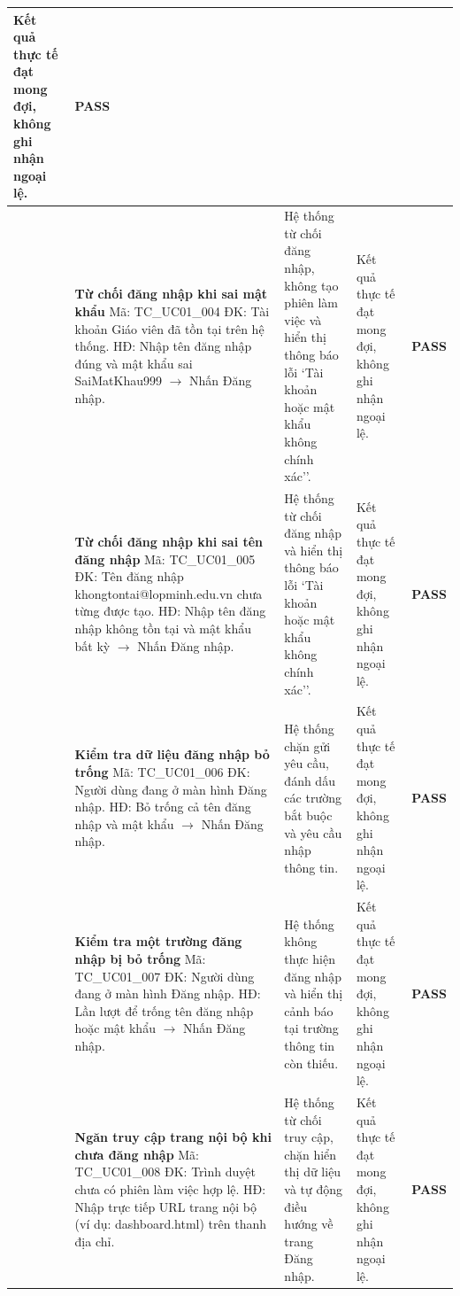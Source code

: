 \begin{longtable}{|>{\centering\arraybackslash}p{0.8cm}|>{\raggedright\arraybackslash}p{4.6cm}|>{\raggedright\arraybackslash}p{3.8cm}|>{\raggedright\arraybackslash}p{3.8cm}|>{\centering\arraybackslash}p{1.5cm}|}
Kết quả thực tế đạt mong đợi, không ghi nhận ngoại lệ. & \textbf{PASS} \\
\hline
4 & \textbf{Từ chối đăng nhập khi sai mật khẩu}\newline
Mã: TC\_UC01\_004\newline
ĐK: Tài khoản Giáo viên đã tồn tại trên hệ thống.\newline
HĐ: Nhập tên đăng nhập đúng và mật khẩu sai SaiMatKhau999 $\rightarrow$ Nhấn Đăng nhập. &
Hệ thống từ chối đăng nhập, không tạo phiên làm việc và hiển thị thông báo lỗi `Tài khoản hoặc mật khẩu không chính xác''. &
Kết quả thực tế đạt mong đợi, không ghi nhận ngoại lệ. & \textbf{PASS} \\
\hline
5 & \textbf{Từ chối đăng nhập khi sai tên đăng nhập}\newline
Mã: TC\_UC01\_005\newline
ĐK: Tên đăng nhập khongtontai@lopminh.edu.vn chưa từng được tạo.\newline
HĐ: Nhập tên đăng nhập không tồn tại và mật khẩu bất kỳ $\rightarrow$ Nhấn Đăng nhập. &
Hệ thống từ chối đăng nhập và hiển thị thông báo lỗi `Tài khoản hoặc mật khẩu không chính xác''. &
Kết quả thực tế đạt mong đợi, không ghi nhận ngoại lệ. & \textbf{PASS} \\
\hline
6 & \textbf{Kiểm tra dữ liệu đăng nhập bỏ trống}\newline
Mã: TC\_UC01\_006\newline
ĐK: Người dùng đang ở màn hình Đăng nhập.\newline
HĐ: Bỏ trống cả tên đăng nhập và mật khẩu $\rightarrow$ Nhấn Đăng nhập. &
Hệ thống chặn gửi yêu cầu, đánh dấu các trường bắt buộc và yêu cầu nhập thông tin. &
Kết quả thực tế đạt mong đợi, không ghi nhận ngoại lệ. & \textbf{PASS} \\
\hline
7 & \textbf{Kiểm tra một trường đăng nhập bị bỏ trống}\newline
Mã: TC\_UC01\_007\newline
ĐK: Người dùng đang ở màn hình Đăng nhập.\newline
HĐ: Lần lượt để trống tên đăng nhập hoặc mật khẩu $\rightarrow$ Nhấn Đăng nhập. &
Hệ thống không thực hiện đăng nhập và hiển thị cảnh báo tại trường thông tin còn thiếu. &
Kết quả thực tế đạt mong đợi, không ghi nhận ngoại lệ. & \textbf{PASS} \\
\hline
8 & \textbf{Ngăn truy cập trang nội bộ khi chưa đăng nhập}\newline
Mã: TC\_UC01\_008\newline
ĐK: Trình duyệt chưa có phiên làm việc hợp lệ.\newline
HĐ: Nhập trực tiếp URL trang nội bộ (ví dụ: dashboard.html) trên thanh địa chỉ. &
Hệ thống từ chối truy cập, chặn hiển thị dữ liệu và tự động điều hướng về trang Đăng nhập. &
Kết quả thực tế đạt mong đợi, không ghi nhận ngoại lệ. & \textbf{PASS} \\
\hline
\end{longtable}

